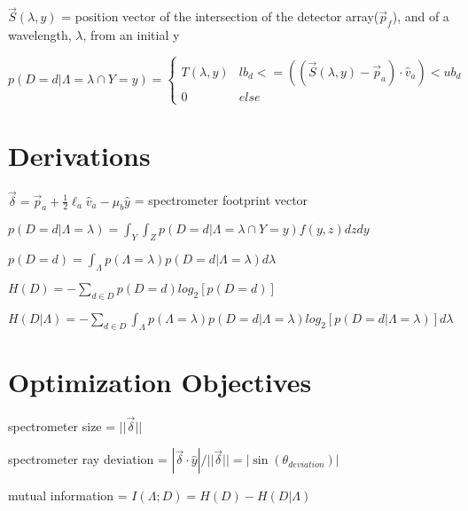 \documentclass{article}
\begin{document}
$\vec{S}(\lambda, y)$ = position vector of the intersection of the detector array($\vec{p}_f$), and of a wavelength, $\lambda$, from an initial y

\[p(D=d|\Lambda=\lambda \cap Y=y) = \begin{cases}
		T(\lambda, y) & lb_d <= ((\vec{S}(\lambda, y) - \vec{p}_a) \cdot \hat{v}_a) < ub_d \\
		0             & else
	\end{cases}\]

\section{Derivations}\label{sec:derivations}

$\vec{\delta} = \vec{p}_a + \frac{1}{2} \ell_a \hat{v}_a - \mu_b \hat{y}$ = spectrometer footprint vector

$p(D=d|\Lambda=\lambda) = \int_Y\int_Z p(D=d|\Lambda=\lambda \cap Y=y)f(y, z)dz dy$

$p(D=d) = \int_\Lambda p(\Lambda=\lambda) p(D=d|\Lambda=\lambda)d\lambda$

$H(D) = -\sum_{d \in D}p(D=d) log_2[p(D=d)]$

$H(D|\Lambda) = -\sum_{d \in D}\int_{\Lambda}p(\Lambda=\lambda) p(D=d|\Lambda=\lambda) log_2[p(D=d|\Lambda=\lambda)] d\lambda$

\section{Optimization Objectives}\label{sec:optimization-objectives}

spectrometer size = $||\vec{\delta}||$

spectrometer ray deviation = $| \vec{\delta} \cdot \hat{y} | / ||\vec{\delta}|| = | \sin(\theta_{deviation}) | $

mutual information = $I(\Lambda; D) = H(D) - H(D|\Lambda)$
\end{document}
